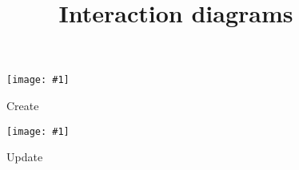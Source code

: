 \documentclass{article}
\newcommand{\diagram}[2]{
	\texttt{[image: \#1]}
	\caption{#2}
}
\newcommand{\vertdiagram}[2]{
	\begin{sidewaysfigure}
		\diagram{#1}{#2}
	\end{sidewaysfigure}
}
\begin{document}
	\title{Interaction diagrams}
	\date{}
	\maketitle
	\vertdiagram{ControllerInteractionCreate}{Create}
	\vertdiagram{ControllerInteractionUpdate}{Update}
\end{document}

